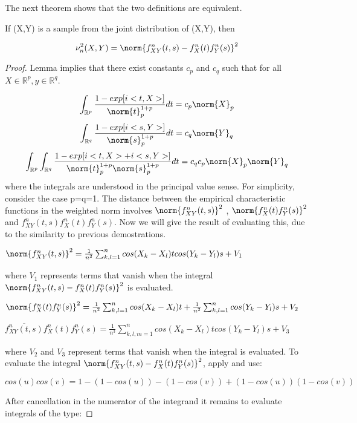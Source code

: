 The next theorem shows that the two definitions are equivalent.

\begin{thm}
If (X,Y) is a sample from the joint distribution of (X,Y), then

$$
\nu_{n}^{2}(X,Y) = \norm{f_{XY}^{n}(t,s) - f_{X}^{n}(t)f_{Y}^{n}(s)}^{2}
$$
\end{thm}

\begin{proof}
Lemma \cite{cd} implies that there exist constants $c_{p}$ and $c_{q}$ such that for all $X\in \mathbb{R}^{p}, y\in \mathbb{R}^{q}$.

$$
\int_{\mathbb{R}^{p}}\frac{1- exp[i<t,X>]}{\norm{t}_{p}^{1+p}}dt = c_p\norm{X}_{p}
$$
$$
\int_{\mathbb{R}^{q}}\frac{1- exp[i<s,Y>]}{\norm{s}_{p}^{1+p}}dt = c_q\norm{Y}_{q}\\
$$
$$
\int_{\mathbb{R}^{p}}\int_{\mathbb{R}^{q}}\frac{1- exp[i<t,X>+i<s,Y>]}{\norm{t}_{p}^{1+p}\norm{s}_{p}^{1+p}}dt = c_qc_p\norm{X}_{p}\norm{Y}_{q}
$$
where the integrals are understood in the principal value sense. For simplicity, consider the case p=q=1. The distance between the empirical characteristic functions in the weighted norm involves $\norm{f_{XY}^{n}(t,s)}^{2}$ , $\norm{f_{X}^{n}(t)f_{Y}^{n}(s)}^{2}$ and $\overline{f_{XY}^{n}(t,s)}f_{X}^{n}(t)f_{Y}^{n}(s)$.
Now we will give the result of evaluating this, due to the similarity to previous demostrations.

$\norm{f_{XY}^{n}(t,s)}^{2} = \frac{1}{n^{2}}\sum_{k,l=1}^{n} cos(X_{k}-X_{l})tcos(Y_{k}-Y_{l})s + V_{1}$

where $V_{1}$ represents terms that vanish when the integral $\norm{f_{XY}^{n}(t,s) - f_{X}^{n}(t)f_{Y}^{n}(s)}^{2}$ is evaluated.

$\norm{f_{X}^{n}(t)f_{Y}^{n}(s)}^{2} = \frac{1}{n^{2}}\sum_{k,l=1}^{n} cos(X_{k}-X_{l})t+ \frac{1}{n^{2}}\sum_{k,l=1}^{n}cos(Y_{k}-Y_{l})s + V_{2}$

$\overline{f_{XY}^{n}(t,s)}f_{X}^{n}(t)f_{Y}^{n}(s) = \frac{1}{n^{3}}\sum_{k,l,m=1}^{n} cos(X_{k}-X_{l})tcos(Y_{k}-Y_{l})s + V_{3}$


where $V_{2}$ and $V_{3}$ represent terms that vanish when the integral is evaluated. To evaluate the integral $\norm{f_{XY}^{n}(t,s) - f_{X}^{n}(t)f_{Y}^{n}(s)}^{2}$, apply \cite{cd} and use:

$$
cos(u)cos(v) = 1-(1-cos(u))-(1-cos(v))+(1-cos(u))(1-cos(v))
$$

After cancellation in the numerator of the integrand it remains to evaluate integrals of the type:


\end{proof}
